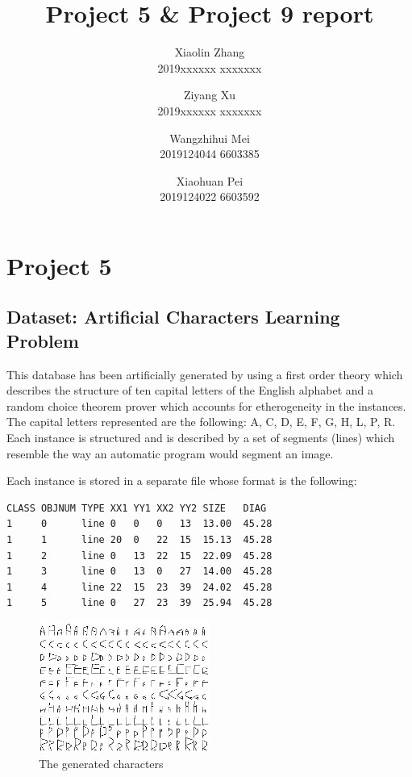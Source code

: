 \documentclass[11pt,en,cite=authoryear]{elegantpaper}
\title{Project 5 \& Project 9 report}
\author{Xiaolin Zhang \\ 2019xxxxxx xxxxxxx \and Ziyang Xu \\2019xxxxxx xxxxxxx  \and Wangzhihui Mei \\ 2019124044 6603385  \and Xiaohuan Pei \\ 2019124022 6603592}
\institute{CCNU-UOW JI}
\date{}
\begin{document}
\maketitle


\section{Project 5}
\subsection{Dataset: Artificial Characters Learning Problem}

This database has been artificially generated by using a first order theory which describes the structure of ten capital letters of the English alphabet and a random choice theorem prover which accounts for etherogeneity in the instances. The capital letters represented are the following: A, C, D, E, F, G, H, L, P, R. Each instance is structured and is described by a set of segments (lines) which resemble the way an automatic program would segment an image. 


Each instance is stored in a separate file whose format is the following:
\begin{lstlisting}
CLASS OBJNUM TYPE XX1 YY1 XX2 YY2 SIZE   DIAG
1     0      line 0   0   0   13  13.00  45.28
1     1      line 20  0   22  15  15.13  45.28
1     2      line 0   13  22  15  22.09  45.28
1     3      line 0   13  0   27  14.00  45.28
1     4      line 22  15  23  39  24.02  45.28
1     5      line 0   27  23  39  25.94  45.28
\end{lstlisting}

\begin{figure}[h]
	\centering
	\includegraphics[width=0.5\textwidth]{image/chars}
	\caption{The generated characters}
	\label{chars}
\end{figure}
\end{document}
